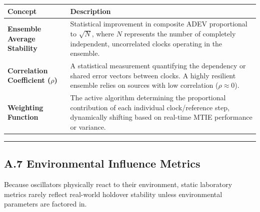 \documentclass[
]{article}
\newcounter{none} %
\begin{document}
{\def\LTcaptype{none} %
\begin{longtable}[]{@{}
  >{\raggedright\arraybackslash}p{}
  >{\raggedright\arraybackslash}p{}@{}}
\toprule\noalign{}
Concept & Description \\
\midrule\noalign{}
\endhead
\bottomrule\noalign{}
\endlastfoot
\textbf{Ensemble Average Stability} & Statistical improvement in
composite ADEV proportional to \(\sqrt{N}\), where \(N\) represents the
number of completely independent, uncorrelated clocks operating in the
ensemble. \\
\textbf{Correlation Coefficient (\(\rho\))} & A statistical measurement
quantifying the dependency or shared error vectors between clocks. A
highly resilient ensemble relies on sources with low correlation
(\(\rho \approx 0\)). \\
\textbf{Weighting Function} & The active algorithm determining the
proportional contribution of each individual clock/reference step,
dynamically shifting based on real-time MTIE performance or variance. \\
\end{longtable}
}

\begin{center}\rule{0.5\linewidth}{0.5pt}\end{center}

\subsection{A.7 Environmental Influence
Metrics}\label{a.7-environmental-influence-metrics}

Because oscillators physically react to their environment, static
laboratory metrics rarely reflect real-world holdover stability unless
environmental parameters are factored in.
\end{document}
